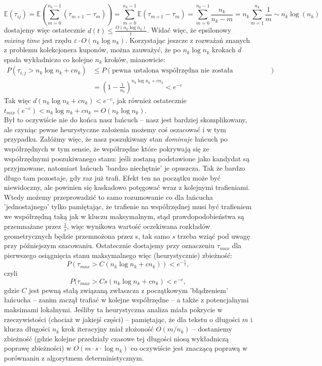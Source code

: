 \documentclass[a4paper]{article}
\theoremstyle{defn}
\theoremstyle{theorem}
\theoremstyle{lemma}
\theoremstyle{cor}
\theoremstyle{fact}
\begin{document}
$$\mathbb{E}(\tau_{ij}) = \mathbb{E}(\sum\limits_{m=0}^{n_k - 1} (\tau_{m+1} - \tau_m)) = \sum\limits_{m=0}^{n_k - 1} \mathbb{E}(\tau_{m+1} - \tau_m) = \sum\limits_{m=0}^{n_k - 1} \frac{n_k}{n_k - m} = n_k \sum\limits_{m=1}^{n_k} \frac{1}{m} \sim n_k \log(n_k)$$
dostajemy więc ostatecznie $d(t) \leq \frac{O(n_k \log n_k)}{t}$. Widać więc, że epsilonowy \textit{mixing time} jest rzędu $\varepsilon \cdot O(n_k \log n_k)$. Korzystając jeszcze z rozważań znanych z problemu kolekcjonera kuponów, można zauważyć, że po $n_k \log n_k$ krokach $d$ spada wykładniczo co kolejne $n_k$ kroków, mianowicie:
\begin{align*}
    P(\tau_{i,j} > n_k \log n_k + cn_k) &\leq P(\text{pewna ustalona współrzędna nie została odwiedzona})\\
    &= (1-\frac{1}{n_k})^{n_k \log n_k + cn_k} < e^{-c}
\end{align*}
Tak więc $d(n_k \log n_k + cn_k) < e^{-c}$, jak również ostatecznie $t_{mix}(e^{-c}) < n_k \log n_k + cn_k = O(n_k \log n_k)$. \\
Był to oczywiście nie do końca nasz łańcuch – nasz jest bardziej skomplikowany, ale czyniąc pewne heurystyczne założenia możemy coś oszacować i w tym przypadku. Załóżmy więc, że nasz poszukiwany stan \textit{dominuje} łańcuch po współrzędnych w tym sensie, że współrzędne które pokrywają się ze współrzędnymi poszukiwanego stanu: jeśli zostaną podstawione jako kandydat są przyjmowane, natomiast łańcuch 'bardzo niechętnie' je opuszcza. Tak że bardzo długo tam pozostaje, gdy raz już trafi. Efekt ten na początku może być niewidoczny, ale powinien się kaskadowo potęgować wraz z kolejnymi trafieniami. Wtedy możemy przeprowadzić to samo rozumowanie co dla łańcucha 'jednostajnego' tylko pamiętając, że trafienie na współrzędnej musi być trafieniem we współrzędną taką jak w kluczu maksymalnym, stąd prawdopodobieństwa są przemnażane przez $\frac{1}{s}$, więc wynikowa wartość oczekiwana rozkładów geometrycznych będzie przemnożona przez s, tak samo $s$ trzeba wziąć pod uwagę przy późniejszym szacowaniu. Ostatecznie dostajemy przy oznaczeniu $\tau_{max}$ dla pierwszego osiągnięcia stanu maksymalnego więc (heurystycznie) zbieżność:
$$P(\tau_{max} > C(n_k \log n_k + cn_k)) < e^{-\frac{c}{s}},$$
czyli
$$P(\tau_{max} > Cs(n_k \log n_k + cn_k) < e^{-c},$$
gdzie $C$ jest pewną stałą związaną zwłaszcza z początkowym 'błądzeniem' łańcucha – zanim zaczął trafiać w kolejne współrzędne – a także z potencjalnymi maksimami lokalnymi. Jeśliby ta heurystyczna analiza miała pokrycie w rzeczywistości (chociaż w jakiejś części) – pamiętając, że dla tekstu o długości $m$ i klucza długości $n_k$ krok iteracyjny miał złożoność $O(m/n_k)$ – dostaniemy zbieżność (gdzie kolejne przedziały czasowe tej długości niosą wykładniczą poprawę zbieżności) w $O(m \cdot s \cdot \log n_k)$ co oczywiście jest znaczącą poprawą w porównaniu z algorytmem deterministycznym.
\\
\end{document}
